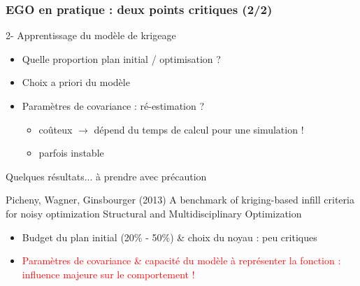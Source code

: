 \begin{frame}
\frametitle{EGO en pratique : deux points critiques (2/2)}

\begin{block}{2- Apprentissage du modèle de krigeage}
\begin{itemize}
 \item Quelle proportion plan initial / optimisation ?
 \item Choix a priori du modèle
 \item Paramètres de covariance : ré-estimation ?
 \begin{itemize}
   \item coûteux $\rightarrow$ dépend du temps de calcul pour une simulation !
   \item parfois instable
  \end{itemize}
\end{itemize}
\end{block}

\begin{block}{Quelques résultats... à prendre avec précaution}
\scriptsize{
 \begin{thebibliography}{7}
\beamertemplatearticlebibitems
     Picheny, Wagner, Ginsbourger (2013)
         \newblock A benchmark of kriging-based infill criteria for noisy optimization
         \newblock Structural and Multidisciplinary Optimization
 \end{thebibliography}
}
\normalsize
\begin{itemize}
 \item Budget du plan initial (20\% - 50\%) \& choix du noyau : peu critiques
 \item \textcolor{red}{Paramètres de covariance \& capacité du modèle à représenter la fonction : influence majeure sur le comportement !}
\end{itemize}
\end{block}
\end{frame}